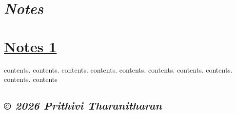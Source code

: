 \documentclass[12pt]{article}
\begin{document}
\section*{\textit{Notes}}

\section*{\href{home/index.html}{Notes 1}}
contents. contents. contents. contents. contents. contents. contents. contents. contents. contents

\bigskip
\subsection*{\textit{© 2026 Prithivi Tharanitharan}}
\end{document}
